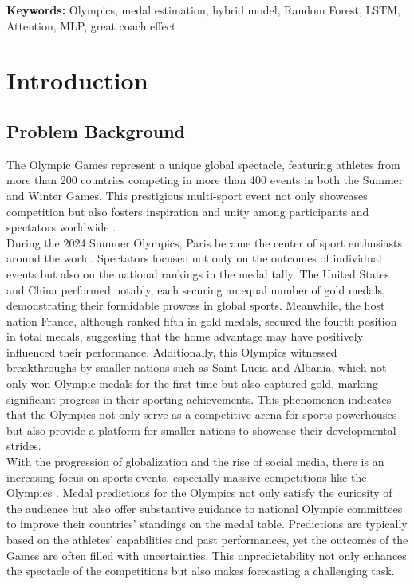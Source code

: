 \documentclass[12pt]{article}
\begin{document}
\noindent \textbf{Keywords:} Olympics, medal estimation, hybrid model, Random Forest, LSTM, Attention,  MLP, great coach effect


\clearpage
\pagestyle{fancy}
\tableofcontents
\newpage
\setcounter{page}{1}

\section{Introduction}
\subsection{Problem Background}
\quad \quad The Olympic Games represent a unique global spectacle, featuring athletes from more than 200 countries competing in more than 400 events in both the Summer and Winter Games. This prestigious multi-sport event not only showcases competition but also fosters inspiration and unity among participants and spectators worldwide \cite{grasso2015historical}.\\

During the 2024 Summer Olympics, Paris became the center of sport enthusiasts around the world. Spectators focused not only on the outcomes of individual events but also on the national rankings in the medal tally. The United States and China performed notably, each securing an equal number of gold medals, demonstrating their formidable prowess in global sports. Meanwhile, the host nation France, although ranked fifth in gold medals, secured the fourth position in total medals, suggesting that the home advantage may have positively influenced their performance. Additionally, this Olympics witnessed breakthroughs by smaller nations such as Saint Lucia and Albania, which not only won Olympic medals for the first time but also captured gold, marking significant progress in their sporting achievements. This phenomenon indicates that the Olympics not only serve as a competitive arena for sports powerhouses but also provide a platform for smaller nations to showcase their developmental strides.\\

With the progression of globalization and the rise of social media, there is an increasing focus on sports events, especially massive competitions like the Olympics \cite{CONDON19991243}. Medal predictions for the Olympics not only satisfy the curiosity of the audience but also offer substantive guidance to national Olympic committees to improve their countries' standings on the medal table. Predictions are typically based on the athletes' capabilities and past performances, yet the outcomes of the Games are often filled with uncertainties. This unpredictability not only enhances the spectacle of the competitions but also makes forecasting a challenging task.
\end{document}
